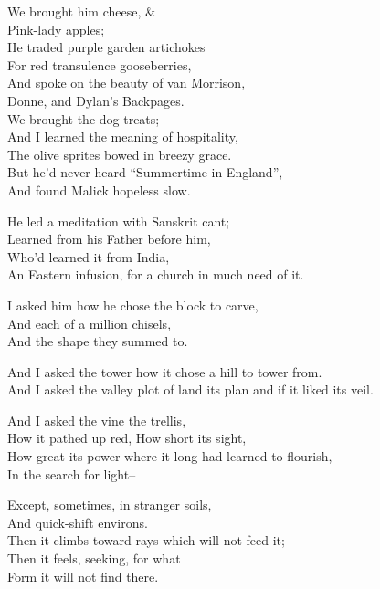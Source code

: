 We brought him cheese, \& \\
Pink-lady apples; \\
He traded purple garden artichokes \\
For red transulence gooseberries, \\
And spoke on the beauty of van Morrison, \\
Donne, and Dylan's Backpages. \\
We brought the dog treats; \\
And I learned the meaning of hospitality, \\
The olive sprites bowed in breezy grace. \\
But he'd never heard ``Summertime in England'', \\
And found Malick hopeless slow.

He led a meditation with Sanskrit cant; \\
Learned from his Father before him, \\
Who'd learned it from India, \\
An Eastern infusion, for a church in much need of it.

I asked him how he chose the block to carve, \\
And each of a million chisels, \\
And the shape they summed to. 

And I asked the tower how it chose a hill to tower from. \\
And I asked the valley plot of land its plan and if it liked its veil.

And I asked the vine the trellis, \\
How it pathed up red, How short its sight, \\
How great its power where it long had learned to flourish, \\
In the search for light--

Except, sometimes, in stranger soils, \\
And quick-shift environs. \\
Then it climbs toward rays which will not feed it; \\
Then it feels, seeking, for what \\
Form it will not find there.